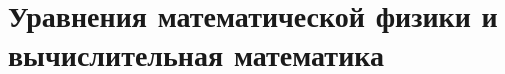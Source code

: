 \documentclass[../../book-ru.tex]{subfiles}
\begin{document}
\chapter{Уравнения математической физики и вычислительная математика}
\label{ch:2.1-mathphys-numerical-ru}
















\end{document}

